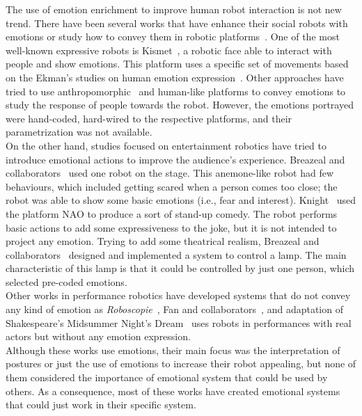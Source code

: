 The use of emotion enrichment to improve human robot interaction is not new trend. There have been several works that have enhance their social robots with emotions or study how to convey them in robotic platforms~\cite{Li2011,Brown2014}. One of the most well-known expressive robots is Kismet~\cite{Breazeal2002}, a robotic face able to interact with people and show emotions. This platform uses a specific set of movements based on the Ekman's studies on human emotion expression~\cite{Ekman2004}. Other approaches have tried to use anthropomorphic~\cite{Arras2012} and human-like platforms to convey emotions to study the response of people towards the robot. However, the emotions portrayed were hand-coded, hard-wired to the respective platforms, and their parametrization was not available.\\
On the other hand, studies focused on entertainment robotics have tried to introduce emotional actions to improve the audience's experience. Breazeal and collaborators~\cite{Breazeal2003} used one robot on the stage. This anemone-like robot had few behaviours, which included getting scared when a person comes too close; the robot was able to show some basic emotions (i.e., fear and interest). Knight~\cite{Knight2011b,Knight2010} used the platform NAO to produce a sort of stand-up comedy. The robot performs basic actions to add some expressiveness to the joke, but it is not intended to project any emotion. Trying to add some theatrical realism, Breazeal and collaborators~\cite{Breazeal2008} designed and implemented a system to control a lamp. The main characteristic of this lamp is that it could be controlled by just one person, which selected pre-coded emotions.\\
Other works in performance robotics have developed systems that do not convey any kind of emotion as \textit{Roboscopie}~\cite{Roboscopie2012,Lemaignan2012}, Fan and collaborators~\cite{Fan2009,Fan2013}, and adaptation of Shakespeare's  Midsummer Night's Dream~\cite{murphy2011} uses robots in performances with real actors but without any emotion expression.\\
Although these works use emotions, their main focus was the interpretation of postures or just the use of emotions to increase their robot appealing, but none of them considered the importance of emotional system that could be used by others. As a consequence, most of these works have created emotional systems that could just work in their specific system.